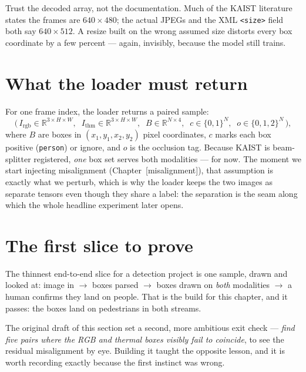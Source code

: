 \documentclass[../main.tex]{subfiles}
\begin{document}
\begin{lesson}
Trust the decoded array, not the documentation. Much of the KAIST literature states the
frames are $640\times480$; the actual JPEGs and the XML \texttt{<size>} field both say
$640\times512$. A resize built on the wrong assumed size distorts every box coordinate by a
few percent --- again, invisibly, because the model still trains.
\end{lesson}

\section{What the loader must return}

For one frame index, the loader returns a paired sample:
\[
  \big(\, I_{\text{rgb}} \in \mathbb{R}^{3\times H\times W},\;\;
          I_{\text{thm}} \in \mathbb{R}^{3\times H\times W},\;\;
          B \in \mathbb{R}^{N\times4},\;\;
          c \in \{0,1\}^{N},\;\;
          o \in \{0,1,2\}^{N} \,\big),
\]
where $B$ are boxes in $(x_1,y_1,x_2,y_2)$ pixel coordinates, $c$ marks each box positive
(\texttt{person}) or ignore, and $o$ is the occlusion tag. Because KAIST is beam-splitter
registered, \emph{one} box set serves both modalities --- for now. The moment we start
injecting misalignment (Chapter~[misalignment]), that assumption is exactly what we perturb,
which is why the loader keeps the two images as separate tensors even though they share a
label: the separation is the seam along which the whole headline experiment later opens.

\section{The first slice to prove}

The thinnest end-to-end slice for a detection project is one sample, drawn and looked at:
image in $\rightarrow$ boxes parsed $\rightarrow$ boxes drawn on \emph{both} modalities
$\rightarrow$ a human confirms they land on people. That is the build for this chapter, and it
passes: the boxes land on pedestrians in both streams.

The original draft of this section set a second, more ambitious exit check --- \emph{find five
pairs where the RGB and thermal boxes visibly fail to coincide}, to see the residual
misalignment by eye. Building it taught the opposite lesson, and it is worth recording exactly
because the first instinct was wrong.
\end{document}

